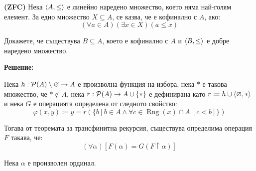 \begin{problem}
\textbf{(ZFC)}
Нека $\langle A, \leq \rangle$ е линейно наредено множество, което няма най-голям елемент.
За едно множество $X \subseteq A$, се казва, че е кофинално с $A$, ако:
\[
(\forall a \in A)(\exists x \in X)(a \leq x)
\]

\quad
Докажете, че съществува $B \subseteq A$, което е кофинално с $A$ и $\langle B, \leq \rangle$ е добре наредено множество.
\end{problem}

\textbf{Решение:}

\smallbreak
\quad
Нека $h: \mathcal{P}(A) \setminus \varnothing \to A$ е произволна функция на избора,
нека $*$ е такова множество, че $* \notin A$,
нека $r: \mathcal{P}(A) \to A \cup \{*\}$ е дефинирана като $r \coloneq h \cup {\langle \varnothing, * \rangle}$ и
нека $G$ е операцията определена от следното свойство:
\[
\varphi(x, y) \coloneq y = r( \{b\ |\ b \in A \land \forall c \in \operatorname{Rng}(x) \cap A \ [c < b] \})
\]

\quad
Тогава от теоремата за трансфинитна рекурсия, съществува определима операция
$F$ такава, че:
\[
(\forall \alpha)[F(\alpha) = G(F \restriction \alpha)]
\]

\quad
Нека $\alpha$ е произволен ординал.

